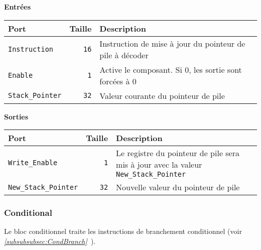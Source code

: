 \documentclass{article}
\begin{document}
    \textbf{Entrées}\\

    \begin{tabular}{|l|r|l|}
        \hline
        \textbf{Port}          & \textbf{Taille} & \textbf{Description}                                     \\
        \hline

        \texttt{Instruction}    & \texttt{16}     & Instruction de mise à jour du pointeur de pile à décoder \\
        \hline
        \texttt{Enable}        & \texttt{1}      & Active le composant.
        Si 0, les sortie sont forcées à 0   \\
        \hline
        \texttt{Stack\_Pointer} & \texttt{32}     & Valeur courante du pointeur de pile                      \\

        \hline
    \end{tabular}

    \vspace{1em}
    \textbf{Sorties}\\

    \begin{tabular}{|l|r|l|}
        \hline
        \textbf{Port}                 & \textbf{Taille} & \textbf{Description}                                                                        \\
        \hline

        \hline
        \texttt{Write\_Enable}      & \texttt{1}      & Le registre du pointeur de pile sera mis à jour avec la valeur \texttt{New\_Stack\_Pointer} \\
        \hline
        \texttt{New\_Stack\_Pointer} & \texttt{32}     & Nouvelle valeur du pointeur de pile                                                         \\

        \hline
    \end{tabular}

    \subsubsection{Conditional}
    \label{sec:Conditional}

    Le bloc conditionnel traite les instructions de branchement conditionnel (voir \textit{\ref{subsubsubsec:CondBranch}~}).
\end{document}
